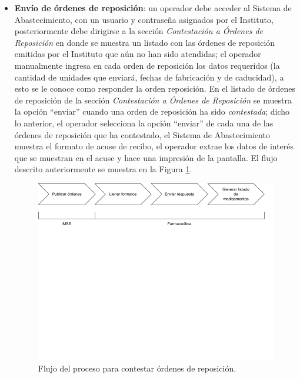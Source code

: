 \documentclass[letterpaper,11pt]{article}
\begin{document}
\begin{itemize}
\item \textbf{Envío de órdenes de reposición}: un operador debe acceder al Sistema de Abastecimiento, con un usuario y contraseña asignados por el Instituto, posteriormente debe dirigirse a la sección \textit{Contestación a Órdenes de Reposición} en donde se muestra un listado con las órdenes de reposición emitidas por el Instituto que aún no han sido atendidas; el operador manualmente ingresa en cada orden de reposición los datos requeridos (la cantidad de unidades que enviará, fechas de fabricación y de caducidad), a esto se le conoce como responder la orden reposición. En el listado de órdenes de reposición de la sección \textit{Contestación a Órdenes de Reposición} se muestra la opción ``enviar'' cuando una orden de reposición ha sido \textit{contestada}; dicho lo anterior, el operador selecciona la opción ``enviar'' de cada una de las órdenes de reposición que ha contestado, el Sistema de Abastecimiento muestra el formato de acuse de recibo, el operador extrae los datos de interés que se muestran en el acuse y hace una impresión de la pantalla. El flujo descrito anteriormente se muestra en la Figura \ref{fig:flow-proc-contestar}.

\begin{figure}[h]
\centering
\includegraphics[scale=0.3]{flujo-proceso-contestar} 
\caption{Flujo del proceso para contestar órdenes de reposición.}
\label{fig:flow-proc-contestar}
\end{figure}


\end{itemize}
\end{document}
